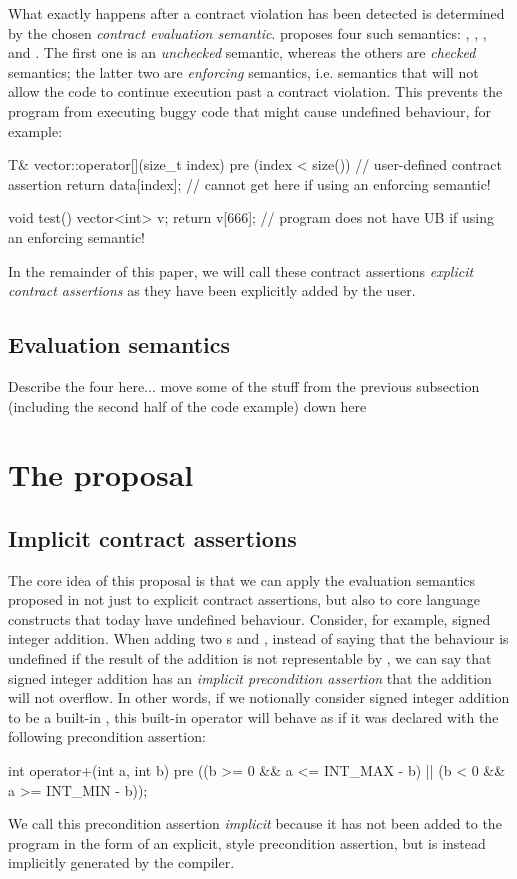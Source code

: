 What exactly happens after a contract violation has been detected is determined by the chosen \emph{contract evaluation semantic}. \cite{P2900R6} proposes four such semantics: , , , and . The first one is an \emph{unchecked} semantic, whereas the others are \emph{checked} semantics; the latter two are \emph{enforcing} semantics, i.e. semantics that will not allow the code to continue execution past a contract violation. This prevents the program from executing buggy code that might cause undefined behaviour, for example:
\begin{codeblock}
T& vector::operator[](size_t index)
  pre (index < size()) {  // user-defined contract assertion
  return data[index];     // cannot get here if using an enforcing semantic!
}

void test() {
  vector<int> v;
  return v[666];  // program does not have UB if using an enforcing semantic!
}
\end{codeblock}
In the remainder of this paper, we will call these \cite{P2900R6} contract assertions \emph{explicit contract assertions} as they have been explicitly added by the user.

\subsection{Evaluation semantics}

Describe the four here... move some of the stuff from the previous subsection (including the second half of the code example) down here

\section{The proposal}

\subsection{Implicit contract assertions}

The core idea of this proposal is that we can apply the evaluation semantics proposed in \cite{P2900R6} not just to explicit contract assertions, but also to core language constructs that today have undefined behaviour. Consider, for example, signed integer addition. When adding two s  and , instead of saying that the behaviour is undefined if the result of the addition is not representable by , we can say that signed integer addition has an \emph{implicit precondition assertion} that the addition will not overflow. In other words, if we notionally consider signed integer addition to be a built-in , this built-in operator will behave as if it was declared with the following precondition assertion:
\begin{codeblock}
int operator+(int a, int b)
  pre ((b >= 0 && a <= INT_MAX - b) || (b < 0 && a >= INT_MIN - b));
\end{codeblock}
We call this precondition assertion \emph{implicit} because it has not been added to the program in the form of an explicit, \cite{P2900R6} style precondition assertion, but is instead implicitly generated by the compiler.


